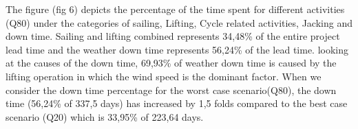 The figure (fig 6) depicts the percentage of the time spent for different activities (Q80) under the categories of sailing, Lifting, Cycle related activities, Jacking and down time. Sailing and lifting combined represents 34,48\% of the entire project lead time and the weather down time represents 56,24\% of the lead time. looking at the causes of the down time, 69,93\% of weather down time is caused by the lifting operation in which the wind speed is the dominant factor. When we consider the down time percentage for the worst case scenario(Q80), the down time (56,24\% of 337,5 days) has increased by 1,5 folds compared to the best case scenario (Q20) which is 33,95\% of 223,64 days. 